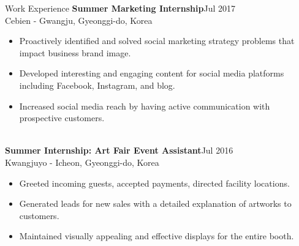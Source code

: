 \documentclass{resume}
\begin{document}
\begin{rSection}{Work Experience}
{\bf Summer Marketing Internship}\hfill{Jul 2017}{}
\\Cebien - Gwangju, Gyeonggi-do, Korea
\begin{itemize}
    \item Proactively identified and solved social marketing strategy problems that impact business brand image. 
    \item Developed interesting and engaging content for social media platforms including Facebook, Instagram, and blog.
    \item Increased social media reach by having active communication with prospective customers.
\end{itemize}

\\{\bf Summer Internship: Art Fair Event Assistant}\hfill {Jul 2016}{}
\\Kwangjuyo - Icheon, Gyeonggi-do, Korea
\begin{itemize}
    \item Greeted incoming guests, accepted payments, directed facility locations.
    \item Generated leads for new sales with a detailed explanation of artworks to customers.
    \item Maintained visually appealing and effective displays for the entire booth.
\end{itemize}

\end{rSection}
\end{document}
